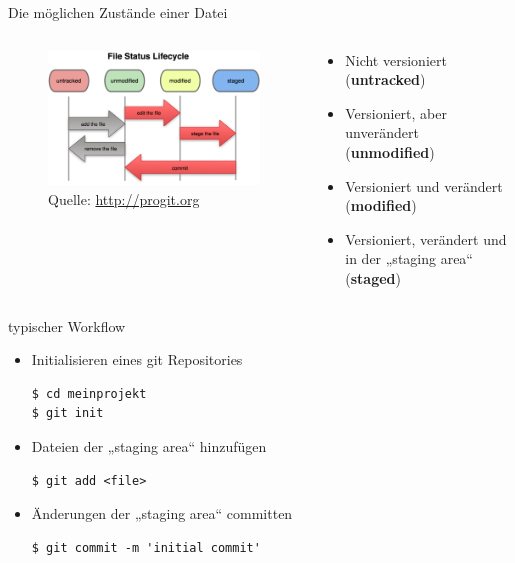 \begin{frame}{Die möglichen Zustände einer Datei}
  \begin{columns}
    \begin{column}{0.45\textwidth}
      \begin{figure}
        \includegraphics[width=\textwidth]{img/file_lifecycle}
        \caption[format=empty]{Quelle: \url{http://progit.org}}
      \end{figure}
    \end{column}
    \begin{column}{0.65\textwidth}
      \begin{itemize}
        \item Nicht versioniert (\textbf{untracked})
        \item Versioniert, aber unverändert (\textbf{unmodified})
        \item Versioniert und verändert (\textbf{modified})
        \item Versioniert, verändert und in der „staging area“ (\textbf{staged})
      \end{itemize}
    \end{column}
  \end{columns}
\end{frame}

\begin{frame}[fragile]{typischer Workflow}
  \begin{itemize}
    \item Initialisieren eines git Repositories
    \begin{lstlisting}
$ cd meinprojekt
$ git init
    \end{lstlisting}
    \item Dateien der „staging area“ hinzufügen
    \begin{lstlisting}
$ git add <file>
    \end{lstlisting}
    \item Änderungen der „staging area“ committen
    \begin{lstlisting}
$ git commit -m 'initial commit'
    \end{lstlisting}
    \end{itemize}
\end{frame}

